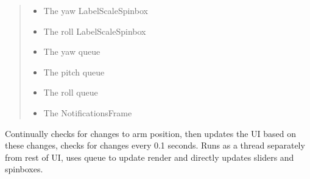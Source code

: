 \documentclass[letterpaper,10pt,english,openany,oneside]{sphinxmanual}
\begin{document}
\begin{fulllineitems}
\begin{fulllineitems}
\begin{quote}
\begin{description}
\begin{itemize}
\item {} 
 \textendash{} The yaw LabelScaleSpinbox

\item {} 
 \textendash{} The roll LabelScaleSpinbox

\item {} 
 \textendash{} The yaw queue

\item {} 
 \textendash{} The pitch queue

\item {} 
 \textendash{} The roll queue

\item {} 
 \textendash{} The NotificationsFrame

\end{itemize}

\end{description}\end{quote}

\end{fulllineitems}


\begin{fulllineitems}
\label{\detokenize{src/positionframe:PositionFrame.PositionUpdater.run}}
Continually checks for changes to arm position, then updates the UI based on these changes, checks for changes every 0.1 seconds.
Runs as a thread separately from rest of UI, uses queue to update render and directly updates sliders and spinboxes.

\end{fulllineitems}


\end{fulllineitems}

\end{document}
